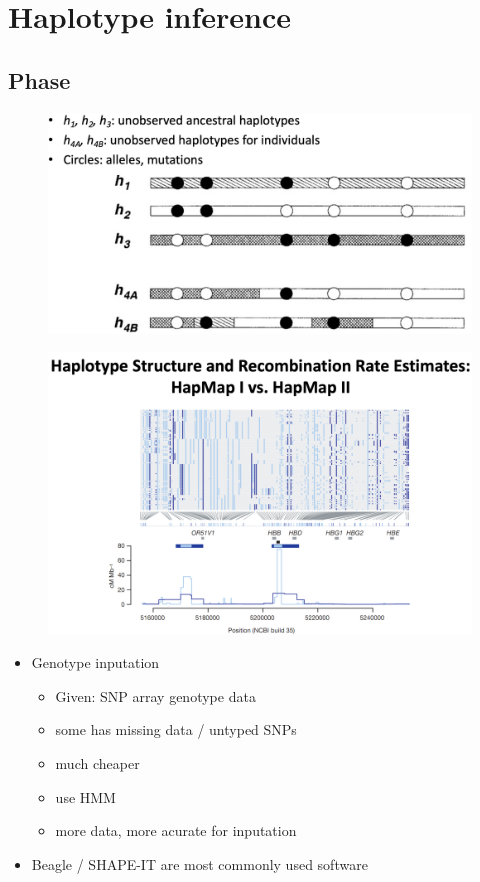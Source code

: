 \documentclass[font=12pt]{article}
\begin{document}
\newpage
\section{Haplotype inference}
\subsection{Phase}
\begin{figure}[h!]
	\centering
	\includegraphics[width=0.7\linewidth]{phase}
	\label{fig:phase}
\end{figure}

\begin{figure}[h!]
	\centering
	\includegraphics[width=0.7\linewidth]{"haplotype structure"}
	\label{fig:haplotype-structure}
\end{figure}
\begin{itemize}
	\item Genotype inputation
	\begin{itemize}
		\item Given: SNP array genotype data
		\item some has missing data / untyped SNPs
		\item much cheaper
		\item use HMM
		\item more data, more acurate for inputation
	\end{itemize}
	\item Beagle / SHAPE-IT are most commonly used software
\end{itemize}
\end{document}
